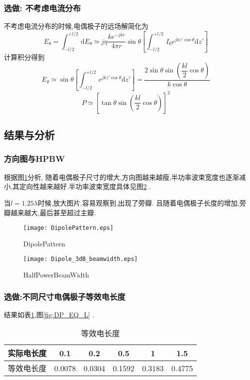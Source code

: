 \subsubsection{选做: 不考虑电流分布}
不考虑电流分布的时候,电偶极子的远场解简化为
\begin{equation}
	E_\theta=\int_{-l/2}^{+l/2}\,\mathrm{d}E_\theta\simeq j\eta\dfrac{ke^{-jkr}}{4\pi r}\sin\theta\left[\int_{-l/2}^{+l/2}\,I_0e^{jkz'\cos\theta}\mathrm{d}z'\right]
\end{equation}
计算积分得到
\begin{equation}
	E_\theta\simeq\sin\theta\left[ \int_{-l/2}^{+l/2}\,e^{jkz'\cos\theta}\mathrm{d}z' \right] =\dfrac{2\sin\theta\sin \left(\dfrac{kl}{2}\cos\theta\right)}{k\cos\theta}
\end{equation}
\begin{equation}
P\simeq \left[\tan\theta\sin\left(\dfrac{kl}{2}\cos\theta\right)\right]^2
\end{equation}
\subsection{结果与分析}
\subsubsection{方向图与HPBW}
根据图\ref{fig:DP}分析, 随着电偶极子尺寸的增大,方向图越来越瘦,半功率波束宽度也逐渐减小,其定向性越来越好.半功率波束宽度具体见图\ref{fig:DP3dB} .

当$l=1.25\lambda$时候,放大图片,容易观察到,出现了旁瓣. 且随着电偶极子长度的增加,旁瓣越来越大,最后甚至超过主瓣.

\begin{figure}[!ht]
\centering
\texttt{[image: DipolePattern.eps]}
\caption{DipolePattern} \label{fig:DP}
\end{figure}

\begin{figure}[!ht]
\centering
\texttt{[image: Dipole\_3dB\_beamwidth.eps]}
\caption{HalfPowerBeamWidth} \label{fig:DP3dB}
\end{figure}
\subsubsection{选做:不同尺寸电偶极子等效电长度}
结果如表\ref{tab:EQ_L},图\ref{fig:DP_EQ_L} .
\\
\begin{table}[!ht]
\centering
\begin{tabular}{cccccc}
\toprule
实际电长度&0.1 &0.2&0.5&1&1.5\\
\midrule
等效电长度&0.0078&0.0304&0.1592&0.3183&0.4775\\
\bottomrule
\end{tabular}
\caption{等效电长度} \label{tab:EQ_L}
\end{table}

